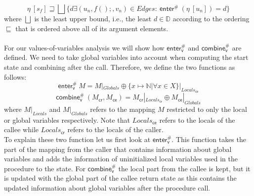     \[\eta\ [s_f] \sqsupseteq \bigsqcup \{ d \exists (u_n, f();, v_n) \in Edges:\ \textsf{enter}^{\#}\ (\eta\ [u_n]) = d \}\]
    where $\bigsqcup$ is the least upper bound, i.e., the least $d \in \mathbb{D}$ according to the ordering $\sqsubseteq$ that is ordered above all of its argument elements.\\
    \\
    For our values-of-variables analysis we will show how $\textsf{enter}^{\#}_\textsf{v}$ and $\textsf{combine}^{\#}_\textsf{v}$ are defined. We need to take global variables into account when computing the start state and combining after the call. Therefore, we define the two functions as follows:
    \[\textsf{enter}^{\#}_\textsf{v}\ M = M|_{Globals} \oplus \{x \mapsto \mathbb{N} | \forall x \in X\}|_{Locals_\textsf{ce}} \]
    \[\textsf{combine}^{\#}_\textsf{v}\ (M_\textsf{cr}, M_\textsf{ce}) = M_\textsf{cr}|_{Locals_\textsf{cr}} \oplus M_\textsf{ce}|_{Globals} \]
    where $M|_{Locals}$ and $M|_{Globals}$ refers to the mapping $M$ restricted to only the local or global variables respectively. Note that $Locals_\textsf{ce}$ refers to the locals of the callee while $Locals_\textsf{cr}$ refers to the locals of the caller.\\
    To explain these two function let us first look at $\textsf{enter}^{\#}_\textsf{v}$. This function takes the part of the mapping from the caller that contains information about global variables and adds the information of uninitialized local variables used in the procedure to the state. For $\textsf{combine}^{\#}_\textsf{v}$ the local part from the callee is kept, but it is updated with the global part of the callee return state as this contains the updated information about global variables after the procedure call.\\

